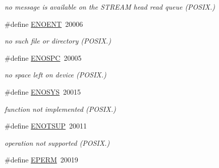 \begin{DoxyCompactItemize}
\begin{DoxyCompactList}\small\item\em no message is available on the S\-T\-R\-E\-A\-M head read queue (P\-O\-S\-I\-X.) \end{DoxyCompactList}\item 
\hypertarget{group__hal_ga03e689f378f643d16ea7537918528a48}{\#define \hyperlink{group__hal_ga03e689f378f643d16ea7537918528a48}{E\-N\-O\-E\-N\-T}~20006}\label{group__hal_ga03e689f378f643d16ea7537918528a48}

\begin{DoxyCompactList}\small\item\em no such file or directory (P\-O\-S\-I\-X.) \end{DoxyCompactList}\item 
\hypertarget{group__hal_ga088abe8bad2df798edad3053d719b937}{\#define \hyperlink{group__hal_ga088abe8bad2df798edad3053d719b937}{E\-N\-O\-S\-P\-C}~20005}\label{group__hal_ga088abe8bad2df798edad3053d719b937}

\begin{DoxyCompactList}\small\item\em no space left on device (P\-O\-S\-I\-X.) \end{DoxyCompactList}\item 
\hypertarget{group__hal_ga43785b9969e0bd1af532dbde06c5540b}{\#define \hyperlink{group__hal_ga43785b9969e0bd1af532dbde06c5540b}{E\-N\-O\-S\-Y\-S}~20015}\label{group__hal_ga43785b9969e0bd1af532dbde06c5540b}

\begin{DoxyCompactList}\small\item\em function not implemented (P\-O\-S\-I\-X.) \end{DoxyCompactList}\item 
\hypertarget{group__hal_ga91457bbf35f0f1085619a99423bb1f33}{\#define \hyperlink{group__hal_ga91457bbf35f0f1085619a99423bb1f33}{E\-N\-O\-T\-S\-U\-P}~20011}\label{group__hal_ga91457bbf35f0f1085619a99423bb1f33}

\begin{DoxyCompactList}\small\item\em operation not supported (P\-O\-S\-I\-X.) \end{DoxyCompactList}\item 
\hypertarget{group__hal_gadd669d31505a077f769cff8e66c780b3}{\#define \hyperlink{group__hal_gadd669d31505a077f769cff8e66c780b3}{E\-P\-E\-R\-M}~20019}\label{group__hal_gadd669d31505a077f769cff8e66c780b3}


\end{DoxyCompactItemize}
